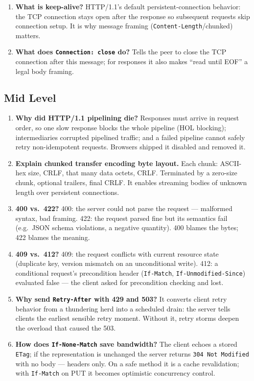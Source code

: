 \begin{enumerate}[label=\textbf{Q\arabic*.}, leftmargin=2.8em]
  \item \textbf{What is keep-alive?} HTTP/1.1's default persistent-connection behavior: the TCP connection stays open after the response so subsequent requests skip connection setup. It is why message framing (\texttt{Content-Length}/chunked) matters.
  \item \textbf{What does \texttt{Connection: close} do?} Tells the peer to close the TCP connection after this message; for responses it also makes ``read until EOF'' a legal body framing.
\end{enumerate}

\subsection*{Mid Level}

\begin{enumerate}[label=\textbf{Q\arabic*.}, leftmargin=2.8em, start=13]
  \item \textbf{Why did HTTP/1.1 pipelining die?} Responses must arrive in request order, so one slow response blocks the whole pipeline (HOL blocking); intermediaries corrupted pipelined traffic; and a failed pipeline cannot safely retry non-idempotent requests. Browsers shipped it disabled and removed it.
  \item \textbf{Explain chunked transfer encoding byte layout.} Each chunk: ASCII-hex size, CRLF, that many data octets, CRLF. Terminated by a zero-size chunk, optional trailers, final CRLF. It enables streaming bodies of unknown length over persistent connections.
  \item \textbf{400 vs.\ 422?} 400: the server could not parse the request --- malformed syntax, bad framing. 422: the request parsed fine but its semantics fail (e.g.\ JSON schema violations, a negative quantity). 400 blames the bytes; 422 blames the meaning.
  \item \textbf{409 vs.\ 412?} 409: the request conflicts with current resource state (duplicate key, version mismatch on an unconditional write). 412: a conditional request's precondition header (\texttt{If-Match}, \texttt{If-Unmodified-Since}) evaluated false --- the client asked for precondition checking and lost.
  \item \textbf{Why send \texttt{Retry-After} with 429 and 503?} It converts client retry behavior from a thundering herd into a scheduled drain: the server tells clients the earliest sensible retry moment. Without it, retry storms deepen the overload that caused the 503.
  \item \textbf{How does \texttt{If-None-Match} save bandwidth?} The client echoes a stored \texttt{ETag}; if the representation is unchanged the server returns \texttt{304 Not Modified} with no body --- headers only. On a safe method it is a cache revalidation; with \texttt{If-Match} on PUT it becomes optimistic concurrency control.

\end{enumerate}
